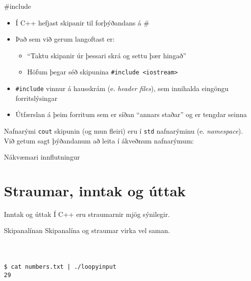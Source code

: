 \documentclass[handout]{beamer}
\begin{document}
\begin{frame}{\#include}
\begin{itemize}
 \item Í C++ hefjast skipanir til forþýðandans á \#
 \item Það sem við gerum langoftast er:
 \begin{itemize}
  \item ``Taktu skipanir úr þessari skrá og settu þær hingað''
  \item Höfum þegar séð skipunina \texttt{\#include <iostream>}
 \end{itemize}
 \item \texttt{\#include} vinnur á hausskrám (e. \emph{header files}), sem innihalda eingöngu forritslýsingar
 \item Útfærslan á þeim forritum sem er síðan ``annars staðar'' og er tengdar seinna
\end{itemize}
\end{frame}

\begin{frame}{Nafnarými}
\texttt{cout} skipunin (og mun fleiri) eru í \texttt{std} nafnarýminu (e. \emph{namespace}). Við getum sagt þýðandanum að leita í ákveðnum nafnarýmum:
\end{frame}

\begin{frame}{Nákvæmari innflutningur}
\end{frame}

\section{Straumar, inntak og úttak}

\begin{frame}{Inntak og úttak}
Í C++ eru straumarnir mjög sýnilegir.
\end{frame}

\begin{frame}[fragile]{Skipanalínan}
Skipanalína og straumar virka vel saman.
\begin{columns}
\inputminted[frame=lines,label=numbers.txt]{bash}{Code/w1/numbers.txt}
\end{columns}
\begin{verbatim}
$ cat numbers.txt | ./loopyinput 
29
\end{verbatim}
\end{frame}
\end{document}
